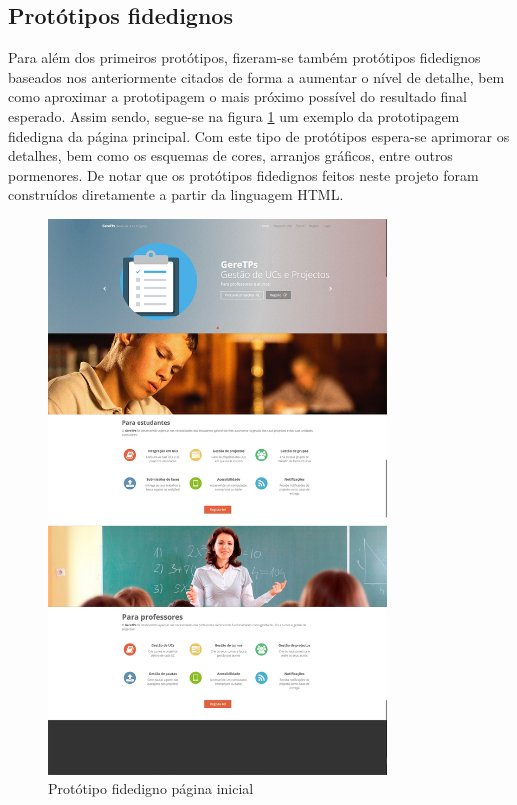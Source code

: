 \subsection{Protótipos fidedignos}
Para além dos primeiros protótipos, fizeram-se também protótipos fidedignos baseados nos anteriormente
citados de forma a aumentar o nível de detalhe, bem como aproximar a prototipagem o mais 
próximo possível do resultado final esperado. Assim sendo, segue-se na figura \ref{fig:prot_fid_home}
um exemplo da prototipagem fidedigna da página principal.
Com este tipo de protótipos espera-se aprimorar os detalhes, bem como os esquemas de cores,
arranjos gráficos, entre outros pormenores.
De notar que os protótipos fidedignos feitos neste projeto foram construídos diretamente a partir
da linguagem HTML.

\begin{figure}[H] 
  \centering
  \includegraphics[width=0.8\textwidth,center]{images/prototipos/fidedigno_home.jpg}
  \caption{Protótipo fidedigno página inicial}
  \label{fig:prot_fid_home}
\end{figure}
